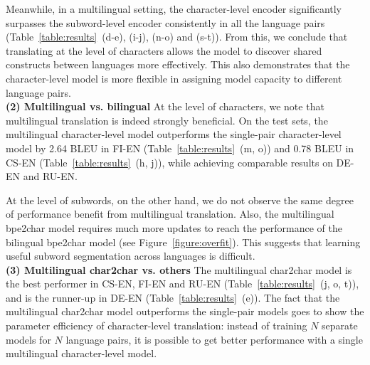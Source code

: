 \documentclass[11pt,letterpaper]{article}
\newcommand{\tb}{\textbf}
\begin{document}
    Meanwhile, in a multilingual setting, the character-level encoder significantly surpasses the subword-level encoder consistently in all the language pairs (Table~\ref{table:results}~(d-e), (i-j), (n-o) and (s-t)). From this, we conclude that translating at the level of characters allows the model to discover shared constructs between languages more effectively. This also demonstrates that the character-level model is more flexible in assigning model capacity to different language pairs.\\

    \noindent\tb{(2) Multilingual vs. bilingual} At the level of characters, we note that multilingual translation is indeed strongly beneficial. On the test sets, the multilingual character-level model outperforms the single-pair character-level model by 2.64 BLEU in FI-EN (Table~\ref{table:results}~(m, o)) and 0.78 BLEU in CS-EN (Table~\ref{table:results}~(h, j)), while achieving comparable results on DE-EN and RU-EN. 

    At the level of subwords, on the other hand, we do not observe the same degree of performance benefit from multilingual translation. Also, the multilingual bpe2char model requires much more updates to reach the performance of the bilingual bpe2char model (see Figure~\ref{figure:overfit}). This suggests that learning useful subword segmentation across languages is difficult. \\

    \noindent\tb{(3) Multilingual char2char vs. others} The multilingual char2char model is the best performer in CS-EN, FI-EN and RU-EN (Table~\ref{table:results}~(j, o, t)), and is the runner-up in DE-EN (Table~\ref{table:results}~(e)). The fact that the multilingual char2char model outperforms the single-pair models goes to show the parameter efficiency of character-level translation: instead of training $N$ separate models for $N$ language pairs, it is possible to get better performance with a single multilingual character-level model.
\end{document}
